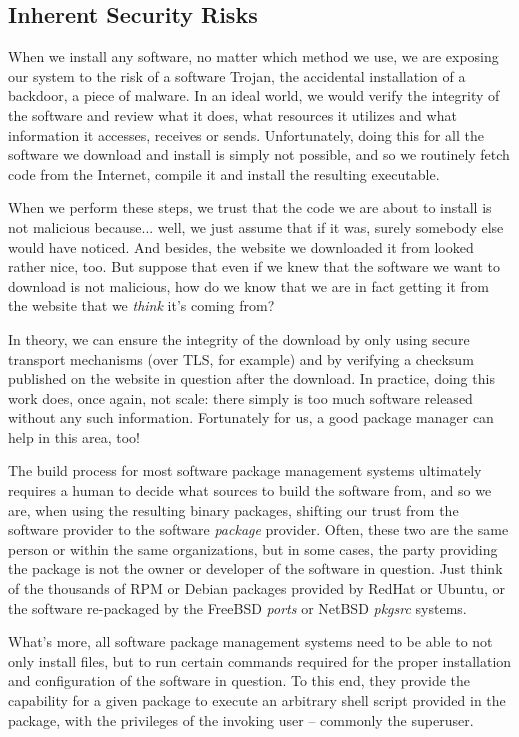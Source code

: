 \subsection{Inherent Security Risks}
\label{software-installation:package-management:security-risks}

When we install any software, no matter which method
we use, we are exposing our system to the risk of a
software Trojan, the accidental installation of a
backdoor, a piece of malware.  In an
ideal world, we would verify the integrity of the
software and review what it does, what resources it
utilizes and what information it accesses, receives or
sends.  Unfortunately, doing this for all the software
we download and install is simply not possible, and so
we routinely fetch code from the Internet, compile it
and install the resulting executable.

When we perform these steps, we trust that the code we
are about to install is not malicious because... well,
we just assume that if it was, surely somebody else
would have noticed.  And besides, the website we
downloaded it from looked rather nice, too.  But
suppose that even if we knew that the software we want
to download is not malicious, how do we know that we
are in fact getting it from the website that we {\em
think} it's coming from?

In theory, we can ensure the integrity of the download
by only using secure transport mechanisms (over TLS,
for example) and by verifying a checksum published on
the website in question after the download.  In
practice, doing this work does, once again, not scale:
there simply is too much software released without any
such information.  Fortunately for us, a good package
manager can help in this area, too!

The build process for most software package management
systems ultimately requires a human to decide what
sources to build the software from, and so we are,
when using the resulting binary packages, shifting our
trust from the software provider to the software {\em
package} provider.  Often, these two are the same
person or within the same organizations, but in some
cases, the party providing the package is not the
owner or developer of the software in question.  Just
think of the thousands of RPM or Debian packages
provided by RedHat or
Ubuntu, or the software re-packaged by
the FreeBSD {\em ports} or NetBSD {\em pkgsrc}
systems.

What's more, all software package management systems
need to be able to not only install files, but to run
certain commands required for the proper installation
and configuration of the software in question.  To
this end, they provide the capability for a given
package to execute an arbitrary shell script provided
in the package, with the privileges of the invoking
user -- commonly the superuser.

